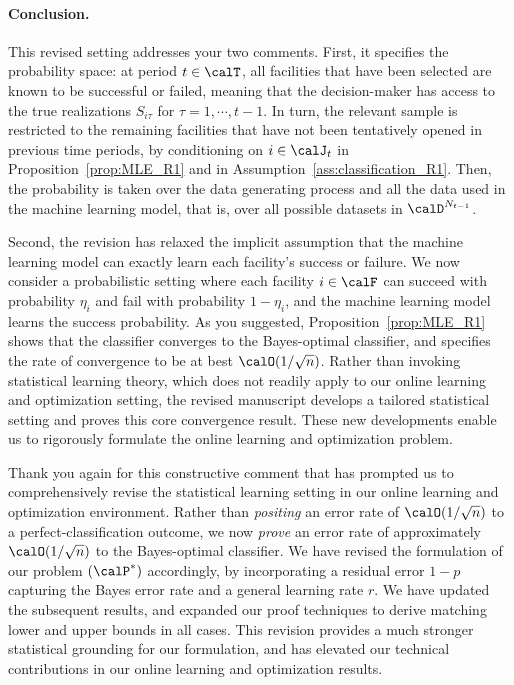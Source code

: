 \documentclass[11pt]{article}
\begin{document}
\paragraph{Conclusion.}
This revised setting addresses your two comments. First, it specifies the probability space: at period $t\in\calT$, all facilities that have been selected are known to be successful or failed, meaning that the decision-maker has access to the true realizations $S_{i\tau}$ for $\tau=1,\cdots,t-1$. In turn, the relevant sample is restricted to the remaining facilities that have not been tentatively opened in previous time periods, by conditioning on $i\in\calJ_t$ in Proposition~\ref{prop:MLE_R1} and in Assumption~\ref{ass:classification_R1}. Then, the probability is taken over the data generating process and all the data used in the machine learning model, that is, over all possible datasets in $\calD^{N_{t-1}}$.

Second, the revision has relaxed the implicit assumption that the machine learning model can exactly learn each facility's success or failure. We now consider a probabilistic setting where each facility $i\in\calF$ can succeed with probability $\eta_{i}$ and fail with probability $1-\eta_{i}$, and the machine learning model learns the success probability. As you suggested, Proposition~\ref{prop:MLE_R1} shows that the classifier converges to the Bayes-optimal classifier, and specifies the rate of convergence to be at best $\calO(1/\sqrt n)$. Rather than invoking statistical learning theory, which does not readily apply to our online learning and optimization setting, the revised manuscript develops a tailored statistical setting and proves this core convergence result. These new developments enable us to rigorously formulate the online learning and optimization problem.

Thank you again for this constructive comment that has prompted us to comprehensively revise the statistical learning setting in our online learning and optimization environment. Rather than \textit{positing} an error rate of $\calO(1/\sqrt n)$ to a perfect-classification outcome, we now \textit{prove} an error rate of approximately $\calO(1/\sqrt n)$ to the Bayes-optimal classifier. We have revised the formulation of our problem $(\calP^*)$ accordingly, by incorporating a residual error $1-p$ capturing the Bayes error rate and a general learning rate $r$. We have updated the subsequent results, and expanded our proof techniques to derive matching lower and upper bounds in all cases. This revision provides a much stronger statistical grounding for our formulation, and has elevated our technical contributions in our online learning and optimization results.
\end{document}
